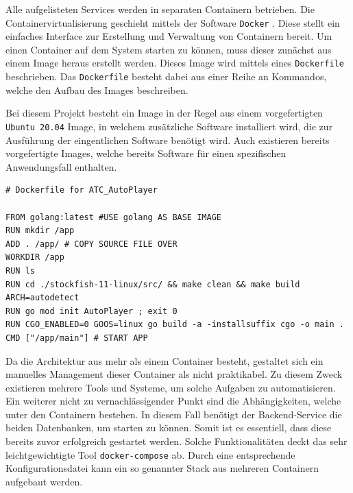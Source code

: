 Alle aufgelisteten Services werden in separaten Containern betrieben.
Die Containervirtualisierung geschieht mittels der Software
\passthrough{\lstinline!Docker!} \cite{docker}. Diese stellt ein
einfaches Interface zur Erstellung und Verwaltung von Containern bereit.
Um einen Container auf dem System starten zu können, muss dieser
zunächst aus einem Image heraus erstellt werden. Dieses Image wird
mittels eines \passthrough{\lstinline!Dockerfile!} beschrieben. Das
\passthrough{\lstinline!Dockerfile!} besteht dabei aus einer Reihe an
Kommandos, welche den Aufbau des Images beschreiben.

Bei diesem Projekt besteht ein Image in der Regel aus einem
vorgefertigten \passthrough{\lstinline!Ubuntu 20.04!} Image, in welchem
zusätzliche Software installiert wird, die zur Ausführung der
eingentlichen Software benötigt wird. Auch existieren bereits
vorgefertigte Images, welche bereits Software für einen spezifischen
Anwendungsfall enthalten.

\begin{lstlisting}
# Dockerfile for ATC_AutoPlayer

FROM golang:latest #USE golang AS BASE IMAGE
RUN mkdir /app
ADD . /app/ # COPY SOURCE FILE OVER
WORKDIR /app
RUN ls
RUN cd ./stockfish-11-linux/src/ && make clean && make build ARCH=autodetect
RUN go mod init AutoPlayer ; exit 0
RUN CGO_ENABLED=0 GOOS=linux go build -a -installsuffix cgo -o main .
CMD ["/app/main"] # START APP
\end{lstlisting}

Da die Architektur aus mehr als einem Container besteht, gestaltet sich
ein manuelles Management dieser Container als nicht praktikabel. Zu
diesem Zweck existieren mehrere Tools und Systeme, um solche Aufgaben zu
automatisieren. Ein weiterer nicht zu vernachlässigender Punkt sind die
Abhängigkeiten, welche unter den Containern bestehen. In diesem Fall
benötigt der Backend-Service die beiden Datenbanken, um starten zu
können. Somit ist es essentiell, dass diese bereits zuvor erfolgreich
gestartet werden. Solche Funktionalitäten deckt das sehr
leichtgewichtigte Tool \passthrough{\lstinline!docker-compose!}
\cite{dockercompose} ab. Durch eine entsprechende
Konfigurationsdatei kann ein so genannter Stack aus mehreren Containern
aufgebaut werden.

